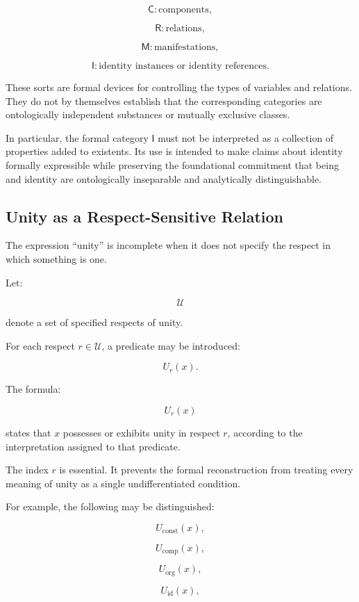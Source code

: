 \[
    \mathsf{C}:
    \text{components},
\]

\[
    \mathsf{R}:
    \text{relations},
\]

\[
    \mathsf{M}:
    \text{manifestations},
\]

\[
    \mathsf{I}:
    \text{identity instances or identity references}.
\]

These sorts are formal devices for controlling
the types of variables and relations. They do
not by themselves establish that the corresponding
categories are ontologically independent substances
or mutually exclusive classes.

In particular, the formal category
\(\mathsf{I}\) must not be interpreted as a
collection of properties added to existents.
Its use is intended to make claims about identity
formally expressible while preserving the
foundational commitment that being and identity
are ontologically inseparable and analytically
distinguishable.

\subsection{Unity as a Respect-Sensitive Relation}

The expression ``unity'' is incomplete when it
does not specify the respect in which something
is one.

Let:

\[
    \mathcal{U}
\]

denote a set of specified respects of unity.

For each respect \(r \in \mathcal{U}\), a predicate
may be introduced:

\[
    U_r(x).
\]

The formula:

\[
    U_r(x)
\]

states that \(x\) possesses or exhibits unity
in respect \(r\), according to the interpretation
assigned to that predicate.

The index \(r\) is essential. It prevents the
formal reconstruction from treating every
meaning of unity as a single undifferentiated
condition.

For example, the following may be distinguished:

\[
    U_{\mathrm{const}}(x),
\]

\[
    U_{\mathrm{comp}}(x),
\]

\[
    U_{\mathrm{org}}(x),
\]

\[
    U_{\mathrm{id}}(x),
\]

